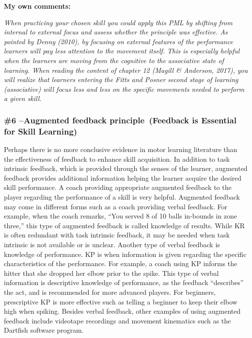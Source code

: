 \documentclass[
  letterpaper,
  DIV=11,
  numbers=noendperiod]{scrartcl}
\begin{document}
\textbf{My own comments:}

\emph{When practicing your chosen skill you could apply this PML by
shifting from internal to external focus and assess whether the
principle was effective. As pointed by Denny (2010), by focusing on
external features of the performance learners will pay less attention to
the movement itself. This is especially helpful when the learners are
moving from the cognitive to the associative state of learning. When
reading the content of chapter 12 (Magill \& Anderson, 2017), you will
realize that learners entering the Fitts and Posner second stage of
learning (associative) will focus less and less on the specific
movements needed to perform a given skill.}

\hypertarget{augmented-feedback-principle-feedback-is-essential-for-skill-learning}{%
\subsubsection{\texorpdfstring{\textbf{\#6 --Augmented feedback
principle~(Feedback is Essential for Skill
Learning)}}{\#6 --Augmented feedback principle~(Feedback is Essential for Skill Learning)}}\label{augmented-feedback-principle-feedback-is-essential-for-skill-learning}}

Perhaps there is no more conclusive evidence in motor learning
literature than the effectiveness of feedback to enhance skill
acquisition. In addition to task intrinsic feedback, which is provided
through the senses of the learner, augmented feedback provides
additional information helping the learner acquire the desired skill
performance. A coach providing appropriate augmented feedback to the
player regarding the performance of a skill is very helpful. Augmented
feedback may come in different forms such as a coach providing verbal
feedback. For example, when the coach remarks, ``You served 8 of 10
balls in-bounds in zone three,'' this type of augmented feedback is
called knowledge of results. While KR is often redundant with task
intrinsic feedback, it may be needed when task intrinsic is not
available or is unclear. Another type of verbal feedback is knowledge of
performance. KP is when information is given regarding the specific
characteristics of the performance. For example, a coach using KP
informs the hitter that she dropped her elbow prior to the spike. This
type of verbal information is descriptive knowledge of performance, as
the feedback ``describes'' the act, and is recommended for more advanced
players. For beginners, prescriptive KP is more effective such as
telling a beginner to keep their elbow high when spiking. Besides verbal
feedback, other examples of using augmented feedback include videotape
recordings and movement kinematics such as the Dartfish software
program.
\end{document}
